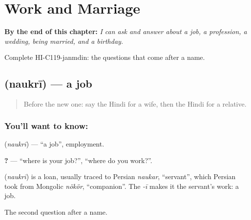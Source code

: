 
\chapter{Work and Marriage}
\label{ch:hi-work-and-marriage}

\begin{chapteropening}
\textbf{By the end of this chapter:} \emph{I can ask and answer about a job, a profession, a wedding, being married, and a birthday.}

Complete HI-C119-janmdin: the questions that come after a name.
\end{chapteropening}

\section[\texorpdfstring{\hi{नौकरी} (naukrī)}{नौकरी (naukrī)}]{ (naukrī) — a job}

\label{lesson:HI-C119-naukri}



\begin{quote}
Before the new one: say the Hindi for a wife, then the Hindi for a relative.
\end{quote}

\subsection*{You'll want to know: }
\textbf{} (\emph{naukrī}) — \textquotedblleft{}a job\textquotedblright{}, employment.

\textbf{   ?} — \textquotedblleft{}where is your job?\textquotedblright{}, \textquotedblleft{}where do you work?\textquotedblright{}.

\begin{cousinweb}
\textbf{} (\emph{naukrī}) is a loan, usually traced to Persian \emph{naukar}, \textquotedblleft{}servant\textquotedblright{}, which Persian took from Mongolic \emph{nökör}, \textquotedblleft{}companion\textquotedblright{}. The \emph{-ī} makes it the servant's work: a job.
\end{cousinweb}

\begin{grammarlens}[title={What you've built}]
The second question after a name.
\end{grammarlens}

